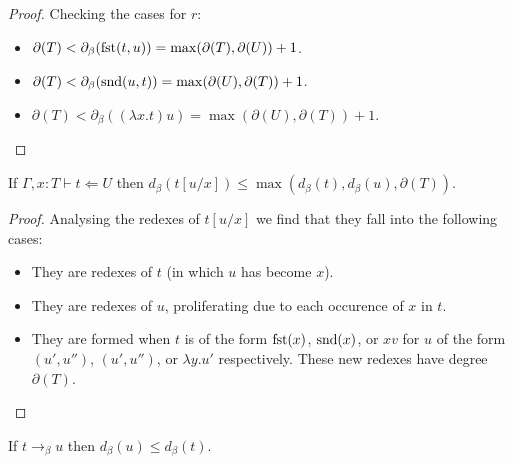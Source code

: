 \begin{proof}
    Checking the cases for $r$:
    \begin{itemize}
        \item $\partial (T) < \partial_{\beta}(\mathrm{fst}(t, u)) = \max(\partial(T), \partial(U)) + 1$.
        \item $\partial (T) < \partial_{\beta}(\mathrm{snd}(u, t)) = \max(\partial(U), \partial(T)) + 1$.
        \item $\partial (T) < \partial_{\beta}((\lambda x . t)u) = \max(\partial(U), \partial(T)) + 1$.
    \end{itemize}
\end{proof}

\begin{lemma}\label{beta_sub_ineq}
    If $\Gamma , x : T \vdash t \Leftarrow U$ then $d_{\beta}(t[u/x]) \leq \max(d_{\beta}(t), d_{\beta}(u), \partial(T))$.
\end{lemma}

\begin{proof}
    Analysing the redexes of $t[u/x]$ we find that they fall into the following cases:
    \begin{itemize}
        \item They are redexes of $t$ (in which $u$ has become $x$).
        \item They are redexes of $u$, proliferating due to each occurence of $x$ in $t$.
        \item They are formed when $t$ is of the form $\mathrm{fst}(x)$, $\mathrm{snd}(x)$, or $x v$ for $u$ of the form $(u', u'')$, $(u', u'')$, or $\lambda y . u'$ respectively. These new redexes have degree $\partial(T)$.
    \end{itemize}
\end{proof}

\begin{lemma}\label{beta_reduct_ineq}
    If $t \to_{\beta} u$ then $d_{\beta}(u) \le d_{\beta}(t)$.    
\end{lemma}

